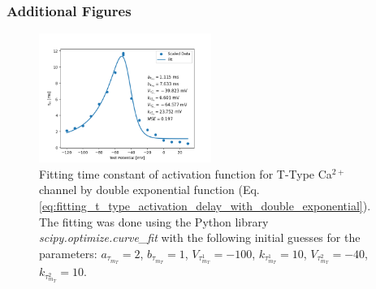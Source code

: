 \documentclass[../../workflow.tex]{subfiles}
\begin{document}
\subsubsection{Additional Figures}
\begin{figure}[H]
    \centering
    \includegraphics[width=0.5\textwidth, page=1]{./img/t_type_calcium_channel/activation_fit_by_double_exponentials.png}
    \caption{
        Fitting time constant of activation function for T-Type Ca$^{2+}$ channel by double exponential function
        (Eq. \ref{eq:fitting_t_type_activation_delay_with_double_exponential}). The fitting was done using the Python
        library \textit{scipy.optimize.curve\_fit} with the following initial guesses for the parameters:
        $a_{\tau_{m_T}}=2$, $b_{\tau_{m_T}}=1$, $V_{\tau_{m_T}^1}=-100$, $k_{\tau_{m_T}^1}=10$,
        $V_{\tau_{m_T}^2}=-40$, $k_{\tau_{m_T}^2}=10$.
    }
\end{figure}

\newpage
\printbibliography
\end{document}
